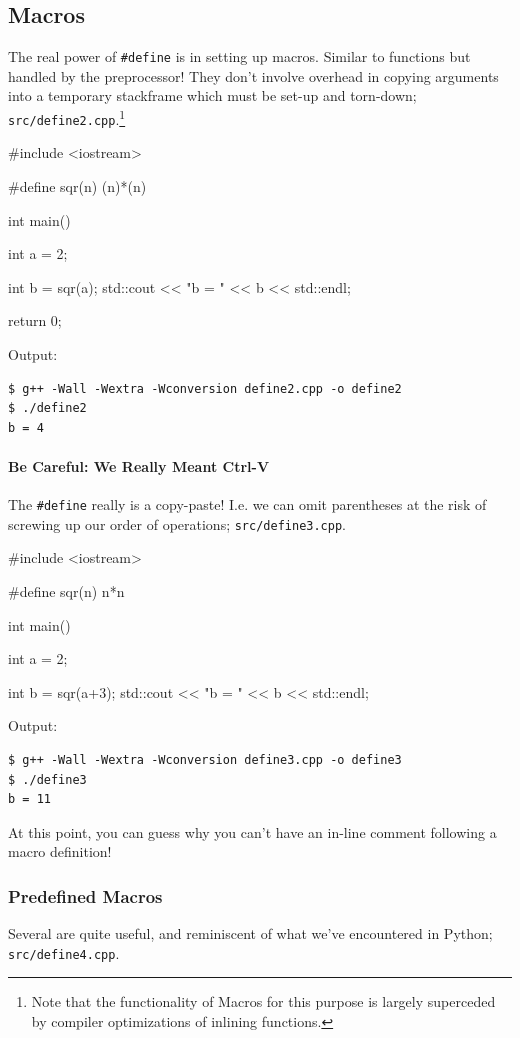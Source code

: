 \documentclass[12pt,letterpaper,twoside]{article}
\begin{document}
\subsection{Macros}
The real power of \texttt{\#define} is in setting up macros.
Similar to functions but handled by the preprocessor! They don't involve overhead in
copying arguments into a temporary stackframe which must be set-up and torn-down;
\texttt{src/define2.cpp}.\footnote{Note that
the functionality of Macros for this purpose is largely superceded by compiler optimizations
of inlining functions.}

\begin{cpp}
#include <iostream>

#define sqr(n) (n)*(n)

int main() {
  int a = 2;

  int b = sqr(a);
  std::cout << "b = " << b << std::endl;

  return 0;
}
\end{cpp}

Output:

\begin{verbatim}
$ g++ -Wall -Wextra -Wconversion define2.cpp -o define2
$ ./define2
b = 4
\end{verbatim}

\paragraph{Be Careful: We Really Meant Ctrl-V} The \texttt{\#define} really is a 
copy-paste! I.e. we can omit parentheses at the risk of screwing up our order of operations;
\texttt{src/define3.cpp}.

\begin{cpp}
#include <iostream>

#define sqr(n) n*n

int main() {
  int a = 2;

  int b = sqr(a+3);
  std::cout << "b = " << b << std::endl;
}
\end{cpp}

Output:

\begin{verbatim}
$ g++ -Wall -Wextra -Wconversion define3.cpp -o define3
$ ./define3
b = 11
\end{verbatim}

At this point, you can guess why you can't have an in-line comment following a macro definition!

\subsubsection{Predefined Macros} Several are quite useful, and reminiscent of what we've
encountered in Python;
\texttt{src/define4.cpp}.
\end{document}
